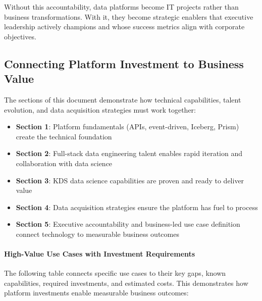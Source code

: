 \documentclass[12pt, a4paper]{article}
\begin{document}
Without this accountability, data platforms become IT projects rather than business transformations. With it, they become strategic enablers that executive leadership actively champions and whose success metrics align with corporate objectives.

\subsection{Connecting Platform Investment to Business Value}

The sections of this document demonstrate how technical capabilities, talent evolution, and data acquisition strategies must work together:

\begin{itemize}[leftmargin=*, nosep]
    \item \textbf{Section 1}: Platform fundamentals (APIs, event-driven, Iceberg, Prism) create the technical foundation
    \item \textbf{Section 2}: Full-stack data engineering talent enables rapid iteration and collaboration with data science
    \item \textbf{Section 3}: KDS data science capabilities are proven and ready to deliver value
    \item \textbf{Section 4}: Data acquisition strategies ensure the platform has fuel to process
    \item \textbf{Section 5}: Executive accountability and business-led use case definition connect technology to measurable business outcomes
\end{itemize}

\paragraph{High-Value Use Cases with Investment Requirements}
The following table connects specific use cases to their key gaps, known capabilities, required investments, and estimated costs. This demonstrates how platform investments enable measurable business outcomes:

\vspace{1em}
\end{document}
